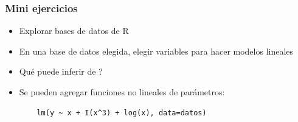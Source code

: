 \documentclass[14pt,aspectratio=169,xcolor=dvipsnames]{beamer}
\begin{document}
\begin{frame}
    \maketitle
\end{frame}
\begin{frame}\frametitle{Mini ejercicios}
    \begin{itemize}
        \item Explorar bases de datos de R
        \item En una base de datos elegida, elegir variables para hacer modelos lineales
        \item Qué puede inferir de ?
        \item Se pueden agregar funciones no lineales de parámetros:
            \begin{verbatim}
    lm(y ~ x + I(x^3) + log(x), data=datos)
            \end{verbatim}
    \end{itemize}
\end{frame}
\end{document}
